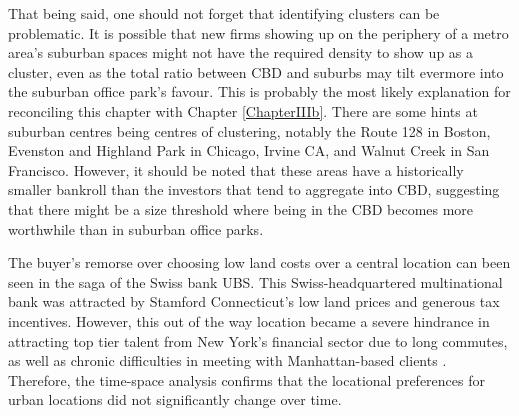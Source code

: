 That being said, one should not forget that identifying clusters can be problematic.  It is possible that new firms showing up on the periphery of a metro area's suburban spaces might not have the required density to show up as a cluster, even as the total ratio between CBD and suburbs may tilt evermore into the suburban office park's favour.  This is probably the most likely explanation for reconciling this chapter with Chapter \ref{ChapterIIIb}.  There are some hints at suburban centres being centres of clustering, notably the Route 128 in Boston, Evenston and Highland Park in Chicago, Irvine CA, and Walnut Creek in San Francisco.  However, it should be noted that these areas have a historically smaller bankroll than the investors that tend to aggregate into CBD, suggesting that there might be a size threshold where being in the CBD becomes more worthwhile than in suburban office parks.  

The buyer's remorse over choosing low land costs over a central location can been seen in the saga of the Swiss bank UBS.  This Swiss-headquartered multinational bank was attracted by Stamford Connecticut's low land prices and generous tax incentives.  However, this out of the way location became a severe hindrance in attracting top tier talent from New York's financial sector due to long commutes, as well as chronic difficulties in meeting with Manhattan-based clients \citep{NYT_2011}.  Therefore, the time-space analysis confirms that the locational preferences for urban locations did not significantly change over time.  
